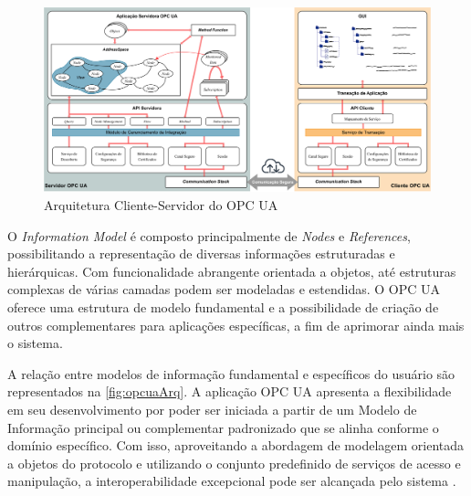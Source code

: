         \begin{figure}[htbp]
            \caption{Arquitetura Cliente-Servidor do OPC UA}
            \label{fig:opcuaArqCS}
            \begin{center}
                \includegraphics[width=1\linewidth]{USPSC-img/opcuaClientServerArc1.png}
            \end{center}
        \end{figure}

        O \textit{Information Model} é composto principalmente de \textit{Nodes} e \textit{References}, possibilitando a representação de diversas informações estruturadas e hierárquicas. Com funcionalidade abrangente orientada a objetos, até estruturas complexas de várias camadas podem ser modeladas e estendidas. O OPC UA oferece uma estrutura de modelo fundamental e a possibilidade de criação de outros complementares para aplicações específicas, a fim de aprimorar ainda mais o sistema.

        A relação entre modelos de informação fundamental e específicos do usuário são representados na \autoref{fig:opcuaArq}. A aplicação OPC UA apresenta a flexibilidade em seu desenvolvimento por poder ser iniciada a partir de um Modelo de Informação principal ou complementar padronizado que se alinha conforme o domínio específico. Com isso, aproveitando a abordagem de modelagem orientada a objetos do protocolo e utilizando o conjunto predefinido de serviços de acesso e manipulação, a interoperabilidade excepcional pode ser alcançada pelo sistema \cite{gong2020}.

